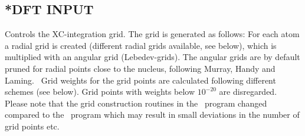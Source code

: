 \subsection{*DFT INPUT}\label{subsec:dftinput}
Controls the XC-integration grid. 
The grid is generated as follows: 
For each atom a radial grid is created (different radial grids available, see below), 
which is multiplied with an angular grid (Lebedev-grids).
The angular grids are by default pruned for radial points close to the nucleus,  
following Murray, Handy and Laming.~\cite{dft-int:pruning} 
Grid weights for the grid points are calculated following different schemes (see below). 
Grid points with weights below $10^{-20}$ are disregarded.  
Please note that the grid construction routines in the \lsdalton\
program changed compared to the \dalton\ program which may result in small deviations in the number of grid points etc.
